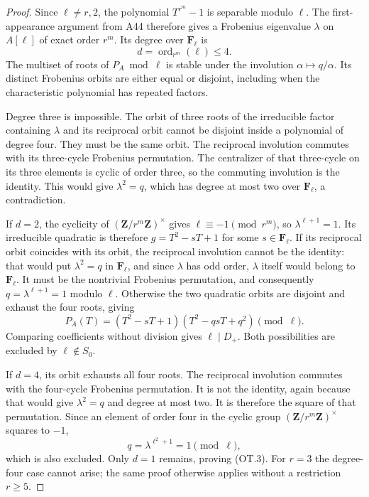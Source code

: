 \begin{proof}
Since $\ell\ne r,2$, the polynomial $T^{r^m}-1$ is separable
modulo $\ell$.  The first-appearance argument from A44 therefore
gives a Frobenius eigenvalue $\lambda$ on $A[\ell]$ of exact
order $r^m$.  Its degree over $\mathbf F_\ell$ is
\[
                 d=\operatorname{ord}_{r^m}(\ell)\le4.
\]
The multiset of roots of $P_A\bmod\ell$ is stable under the
involution $\alpha\mapsto q/\alpha$.  Its distinct Frobenius
orbits are either equal or disjoint, including when the
characteristic polynomial has repeated factors.

Degree three is impossible.  The orbit of three roots of the
irreducible factor containing $\lambda$ and its reciprocal orbit
cannot be disjoint inside a polynomial of degree four.  They must
be the same orbit.  The reciprocal involution commutes with its
three-cycle Frobenius permutation.  The centralizer of that
three-cycle on its three elements is cyclic of order three, so
the commuting involution is the identity.  This would give
$\lambda^2=q$, which has degree at most two over $\mathbf F_\ell$,
a contradiction.

If $d=2$, the cyclicity of
$(\mathbf Z/r^m\mathbf Z)^\times$ gives
$\ell\equiv-1\pmod{r^m}$, so
$\lambda^{\ell+1}=1$.  Its irreducible quadratic is therefore
$g=T^2-sT+1$ for some $s\in\mathbf F_\ell$.
If its reciprocal orbit coincides with its orbit, the reciprocal
involution cannot be the identity: that would put
$\lambda^2=q$ in $\mathbf F_\ell$, and since $\lambda$ has odd
order, $\lambda$ itself would belong to $\mathbf F_\ell$.
It must be the nontrivial Frobenius permutation, and consequently
$q=\lambda^{\ell+1}=1$ modulo $\ell$.
Otherwise the two quadratic orbits are disjoint and exhaust the
four roots, giving
\[
 P_A(T)=(T^2-sT+1)(T^2-qsT+q^2)\pmod\ell.
\]
Comparing coefficients without division gives $\ell\mid D_+$.
Both possibilities are excluded by $\ell\notin S_0$.

If $d=4$, its orbit exhausts all four roots.  The reciprocal
involution commutes with the four-cycle Frobenius permutation.
It is not the identity, again because that would give
$\lambda^2=q$ and degree at most two.  It is therefore the square
of that permutation.  Since an element of order four in the
cyclic group $(\mathbf Z/r^m\mathbf Z)^\times$ squares to $-1$,
\[
 q=\lambda^{\ell^2+1}=1\pmod\ell,
\]
which is also excluded.  Only $d=1$ remains, proving (OT.3).
For $r=3$ the degree-four case cannot arise; the same proof
otherwise applies without a restriction $r\ge5$.
\end{proof}

